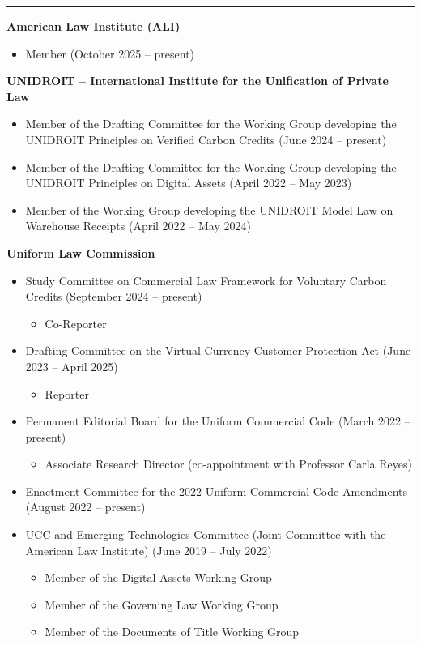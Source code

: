 \documentclass[
  11pt,
  letterpaper]{article}
\begin{document}
\vspace{0.25em}\hrule\vspace{0.7em}

\noindent\textbf{American Law Institute (ALI)}

\begin{itemize}
\item Member (October 2025 -- present)
\end{itemize}

\noindent\textbf{UNIDROIT -- International Institute for the Unification of Private Law}

\begin{itemize}
\item Member of the Drafting Committee for the Working Group developing the UNIDROIT Principles on Verified Carbon Credits (June 2024 -- present)
\item Member of the Drafting Committee for the Working Group developing the UNIDROIT Principles on Digital Assets (April 2022 -- May 2023)
\item Member of the Working Group developing the UNIDROIT Model Law on Warehouse Receipts (April 2022 -- May 2024)
\end{itemize}

\noindent\textbf{Uniform Law Commission}

\begin{itemize}
\item Study Committee on Commercial Law Framework for Voluntary Carbon Credits (September 2024 -- present)
  \begin{itemize}
  \item Co-Reporter
  \end{itemize}
\item Drafting Committee on the Virtual Currency Customer Protection Act (June 2023 -- April 2025)
  \begin{itemize}
  \item Reporter
  \end{itemize}
\item Permanent Editorial Board for the Uniform Commercial Code (March 2022 -- present)
  \begin{itemize}
  \item Associate Research Director (co-appointment with Professor Carla Reyes)
  \end{itemize}
\item Enactment Committee for the 2022 Uniform Commercial Code Amendments (August 2022 -- present)
\item UCC and Emerging Technologies Committee (Joint Committee with the American Law Institute) (June 2019 -- July 2022)
  \begin{itemize}
  \item Member of the Digital Assets Working Group
  \item Member of the Governing Law Working Group
  \item Member of the Documents of Title Working Group
  \end{itemize}
\end{itemize}
\end{document}
